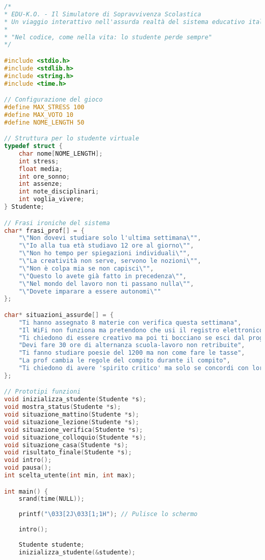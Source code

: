 \documentclass[a4paper,12pt]{article}
\begin{document}
\begin{lstlisting}[language=C, caption=Codice completo (file Capolavoro2.c)]
/*
* EDU-K.O. - Il Simulatore di Sopravvivenza Scolastica
* Un viaggio interattivo nell'assurda realtà del sistema educativo italiano
* 
* "Nel codice, come nella vita: lo studente perde sempre"
*/

#include <stdio.h>
#include <stdlib.h>
#include <string.h>
#include <time.h>

// Configurazione del gioco
#define MAX_STRESS 100
#define MAX_VOTO 10
#define NOME_LENGTH 50

// Struttura per lo studente virtuale
typedef struct {
    char nome[NOME_LENGTH];
    int stress;
    float media;
    int ore_sonno;
    int assenze;
    int note_disciplinari;
    int voglia_vivere;
} Studente;

// Frasi ironiche del sistema
char* frasi_prof[] = {
    "\"Non dovevi studiare solo l'ultima settimana\"",
    "\"Io alla tua età studiavo 12 ore al giorno\"",
    "\"Non ho tempo per spiegazioni individuali\"",
    "\"La creatività non serve, servono le nozioni\"",
    "\"Non è colpa mia se non capisci\"",
    "\"Questo lo avete già fatto in precedenza\"",
    "\"Nel mondo del lavoro non ti passano nulla\"",
    "\"Dovete imparare a essere autonomi\""
};

char* situazioni_assurde[] = {
    "Ti hanno assegnato 8 materie con verifica questa settimana",
    "Il WiFi non funziona ma pretendono che usi il registro elettronico",
    "Ti chiedono di essere creativo ma poi ti bocciano se esci dal programma",
    "Devi fare 30 ore di alternanza scuola-lavoro non retribuite",
    "Ti fanno studiare poesie del 1200 ma non come fare le tasse",
    "La prof cambia le regole del compito durante il compito",
    "Ti chiedono di avere 'spirito critico' ma solo se concordi con loro"
};

// Prototipi funzioni
void inizializza_studente(Studente *s);
void mostra_status(Studente *s);
void situazione_mattino(Studente *s);
void situazione_lezione(Studente *s);
void situazione_verifica(Studente *s);
void situazione_colloquio(Studente *s);
void situazione_casa(Studente *s);
void risultato_finale(Studente *s);
void intro();
void pausa();
int scelta_utente(int min, int max);

int main() {
    srand(time(NULL));
    
    printf("\033[2J\033[1;1H"); // Pulisce lo schermo
    
    intro();
    
    Studente studente;
    inizializza_studente(&studente);
    

\end{lstlisting}
\end{document}
